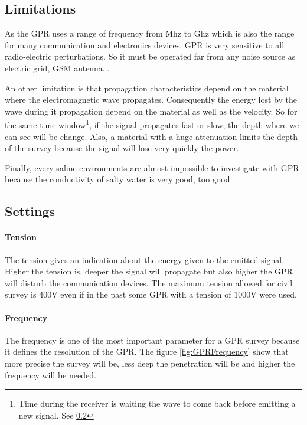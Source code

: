 \subsection{Limitations}

As the GPR uses a range of frequency from Mhz to Ghz which is also the range for many communication and electronics devices, GPR is very sensitive to all radio-electric perturbations. So it must be operated far from any noise source as electric grid, GSM antenna...

An other limitation is that propagation characteristics depend on the material where the electromagnetic wave propagates. Consequently the energy lost by the wave during it propagation depend on the material as well as the velocity. So for the same time window\footnote{Time during the receiver is waiting the wave to come back before emitting a new signal. See \ref{SubSection:settings}}, if the signal propagates fast or slow, the depth where we can see will be change. Also, a material with a huge attenuation limits the depth of the survey because the signal will lose very quickly the power.

Finally, every saline environments are almost impossible to investigate with GPR because the conductivity of salty water is very good, too good\cite{UnderstandingDetection}.

\subsection{Settings} \label{SubSection:settings}


\paragraph{Tension} The tension gives an indication about the energy given to the emitted signal. Higher the tension is, deeper the signal will propagate but also higher the GPR will disturb the communication devices. The maximum tension allowed for civil survey is 400V even if in the past some GPR with a tension of 1000V were used. 

\paragraph{Frequency} The frequency is one of the most important parameter for a GPR survey because it defines the resolution of the GPR. The figure \ref{fig:GPRFrequency} show that more precise the survey will be, less deep the penetration will be and higher the frequency will be needed. 

